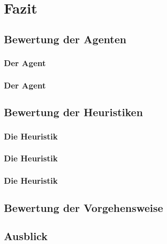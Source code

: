 \chapter{Fazit}

\section{Bewertung der Agenten}
\subsection{Der Agent }
\subsection{Der Agent }

\section{Bewertung der Heuristiken}
\subsection{Die Heuristik }
\subsection{Die Heuristik }
\subsection{Die Heuristik }

\section{Bewertung der Vorgehensweise}

\section{Ausblick}
